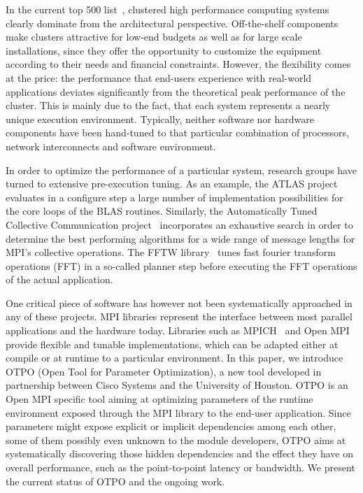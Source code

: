 In the current top 500 list~\cite{top500}, clustered high performance computing systems clearly dominate from the architectural perspective. Off-the-shelf components make clusters attractive for low-end budgets as well as for large scale installations, since they offer the opportunity to customize the equipment according to their needs and financial constraints. However, the flexibility comes at the price: the performance that end-users experience with real-world applications deviates significantly from the theoretical peak performance of the cluster. This is mainly due to the fact, that each system represents a nearly unique execution environment. Typically, neither software nor hardware components have been hand-tuned to that particular combination of processors, network interconnects and software environment. %

In order to optimize the performance of a particular system, research groups have turned to extensive pre-execution tuning. As an example, the ATLAS project~\cite{atlas} evaluates in a configure step a large number of implementation possibilities for the core loops of the BLAS routines. Similarly, the Automatically Tuned Collective Communication project~\cite{pjesa:cluster} incorporates an exhaustive search in order to determine the best performing algorithms for a wide range of message lengths for MPI's collective operations.  The FFTW library~\cite{fftw} tunes fast fourier transform operations (FFT) in a so-called planner step before executing the FFT operations of the actual application.

One critical piece of software has however not been systematically approached in any of these projects. MPI libraries represent the interface between most parallel applications and the hardware today. Libraries such as MPICH~\cite{Gropp:1996:HPI} and Open MPI~\cite{gabriel:ompi} provide flexible and tunable implementations, which can be adapted either at compile or at runtime to a particular environment. In this paper, we introduce OTPO (Open Tool for Parameter Optimization), a new tool developed in partnership between Cisco Systems and the University of Houston. OTPO is an Open MPI specific tool aiming at optimizing parameters of the runtime environment exposed through the MPI library to the end-user application. Since parameters might expose explicit or implicit dependencies among each other, some of them possibly even unknown to the module developers, OTPO aims at systematically discovering those hidden dependencies and the effect they have on overall performance, such as the point-to-point latency or bandwidth. We present the current status of OTPO and the ongoing work.

